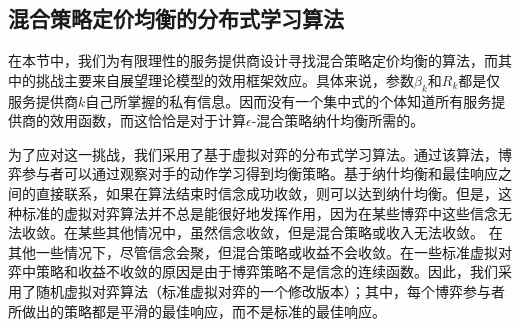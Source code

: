 \subsection{混合策略定价均衡的分布式学习算法}
在本节中，我们为有限理性的服务提供商设计寻找混合策略定价均衡的算法，而其中的挑战主要来自展望理论模型的效用框架效应。具体来说，参数$\beta_k$和$R_k$都是仅服务提供商$k$自己所掌握的私有信息。因而没有一个集中式的个体知道所有服务提供商的效用函数，而这恰恰是对于计算$\epsilon$-混合策略纳什均衡所需的。

为了应对这一挑战，我们采用了基于虚拟对弈的分布式学习算法。通过该算法，博弈参与者可以通过观察对手的动作学习得到均衡策略。基于纳什均衡和最佳响应之间的直接联系，如果在算法结束时信念成功收敛，则可以达到纳什均衡。但是，这种标准的虚拟对弈算法并不总是能很好地发挥作用，因为在某些博弈中这些信念无法收敛。在某些其他情况中，虽然信念收敛，但是混合策略或收入无法收敛。
在其他一些情况下，尽管信念会聚，但混合策略或收益不会收敛。在一些标准虚拟对弈中策略和收益不收敛的原因是由于博弈策略不是信念的连续函数。因此，我们采用了随机虚拟对弈算法（标准虚拟对弈的一个修改版本）；其中，每个博弈参与者所做出的策略都是平滑的最佳响应，而不是标准的最佳响应。

